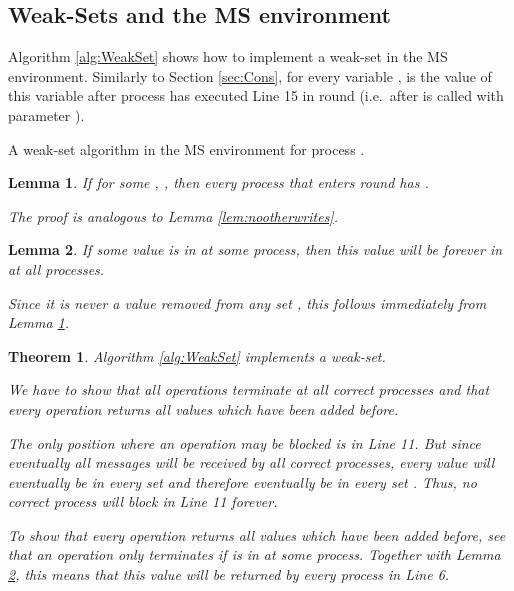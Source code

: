 \documentclass[conference, compsoc]{IEEEtran}
\newtheorem{lemma}{Lemma}
\newtheorem{theorem}{Theorem}
\begin{document}
\subsection{Weak-Sets and the MS environment} 
 
Algorithm \ref{alg:WeakSet} shows how to implement a weak-set in the MS environment.
Similarly to Section \ref{sec:Cons}, for every variable ,  is the value of this variable after process  has executed Line 15 in round  (i.e.~after  is called with parameter ). 

\begin{algorithm}[htb] 
{\small       
{}
\SetVline
       



	
\On{}{
	\;
	\; 
	\lIf{}{
		\;
	}	
	\Return{}\;
}


\caption{A weak-set algorithm in the MS environment for process .}
\label{alg:WeakSet}
}
\end{algorithm}


\begin{lemma}
 \label{lem:safetyWeakSet}
 If for some , , then every process  that enters round  has .
 \begin{IEEEproof} 
 The proof is analogous to Lemma \ref{lem:nootherwrites}.
 \end{IEEEproof}
\end{lemma}

\begin{lemma}
 \label{lem:writtenforever}
 If some value is in  at some process, then this value will be forever in  at all processes.
 \begin{IEEEproof} 
 Since it is never a value removed from any set , this follows immediately from Lemma \ref{lem:safetyWeakSet}.
 \end{IEEEproof}
\end{lemma}

\begin{theorem}
 Algorithm \ref{alg:WeakSet} implements a weak-set. 
 \begin{IEEEproof}
 We have to show that all operations terminate at all correct processes and that every  operation returns all values which have been added before.  
 
 The only position where an operation may be blocked is in Line 11. But since eventually all messages will be received by all correct processes, every value will eventually be in every set  and therefore eventually be in every set . Thus, no correct process will block in Line 11 forever.
 
 To show that every  operation returns all values which have been added before, see that an  operation only terminates if  is in  at some process. Together with Lemma \ref{lem:writtenforever}, this means that this value will be returned by every process in Line 6.    

 \end{IEEEproof}
\end{theorem}
\end{document}
